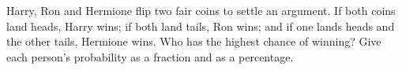 Harry, Ron and Hermione flip two fair coins to settle an argument. If both coins land heads, Harry wins; if both land tails, Ron wins; and if one lands heads and the other tails, Hermione wins. Who has the highest chance of winning? Give each person's probability as a fraction and as a percentage.

